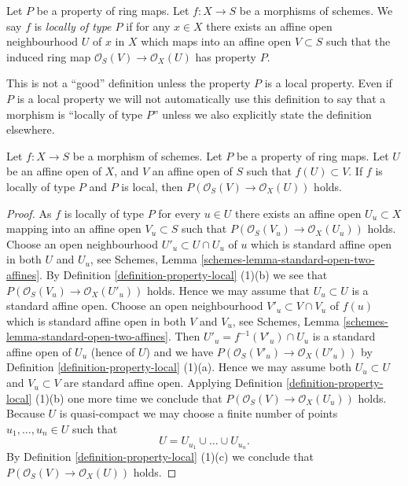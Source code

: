 \begin{definition}
\label{definition-locally-P}
Let $P$ be a property of ring maps.
Let $f : X \to S$ be a morphisms of schemes.
We say $f$ is {\it locally of type $P$} if for any $x \in X$
there exists an affine open neighbourhood $U$ of $x$
in $X$ which maps into an affine open $V \subset S$ such that
the induced ring map $\mathcal{O}_S(V) \to \mathcal{O}_X(U)$
has property $P$.
\end{definition}

\noindent
This is not a ``good'' definition unless the property $P$ is
a local property. Even if $P$ is a local property we will not
automatically use this definition to say that a morphism is
``locally of type $P$'' unless we also explicitly state the
definition elsewhere.

\begin{lemma}
\label{lemma-locally-P}
Let $f : X \to S$ be a morphism of schemes.
Let $P$ be a property of ring maps.
Let $U$ be an affine open of $X$,
and $V$ an affine open of $S$ such that
$f(U) \subset V$.
If $f$ is locally of type $P$ and $P$ is local,
then $P(\mathcal{O}_S(V) \to \mathcal{O}_X(U))$ holds.
\end{lemma}

\begin{proof}
As $f$ is locally of type $P$ for every $u \in U$ there exists an
affine open $U_u \subset X$ mapping into an affine open $V_u \subset S$
such that $P(\mathcal{O}_S(V_u) \to \mathcal{O}_X(U_u))$ holds.
Choose an open neighbourhood $U'_u \subset U \cap U_u$ of $u$
which is standard affine open in both $U$ and $U_u$, see
Schemes, Lemma \ref{schemes-lemma-standard-open-two-affines}.
By Definition \ref{definition-property-local} (1)(b)
we see that $P(\mathcal{O}_S(V_u) \to \mathcal{O}_X(U'_u))$ holds.
Hence we may assume that $U_u \subset U$ is a standard affine open.
Choose an open neighbourhood $V'_u \subset V \cap V_u$
of $f(u)$ which is standard affine open in both $V$ and $V_u$, see
Schemes, Lemma \ref{schemes-lemma-standard-open-two-affines}.
Then $U'_u = f^{-1}(V'_u) \cap U_u$ is a standard affine open
of $U_u$ (hence of $U$) and we have
$P(\mathcal{O}_S(V'_u) \to \mathcal{O}_X(U'_u))$ by
Definition \ref{definition-property-local} (1)(a).
Hence we may assume both $U_u \subset U$ and $V_u \subset V$
are standard affine open. Applying
Definition \ref{definition-property-local} (1)(b)
one more time we conclude that $P(\mathcal{O}_S(V) \to \mathcal{O}_X(U_u))$
holds. Because $U$ is quasi-compact we may choose a finite number
of points $u_1, \ldots, u_n \in U$ such that
$$
U = U_{u_1} \cup \ldots \cup U_{u_n}.
$$
By Definition \ref{definition-property-local} (1)(c)
we conclude that $P(\mathcal{O}_S(V) \to \mathcal{O}_X(U))$ holds.
\end{proof}

